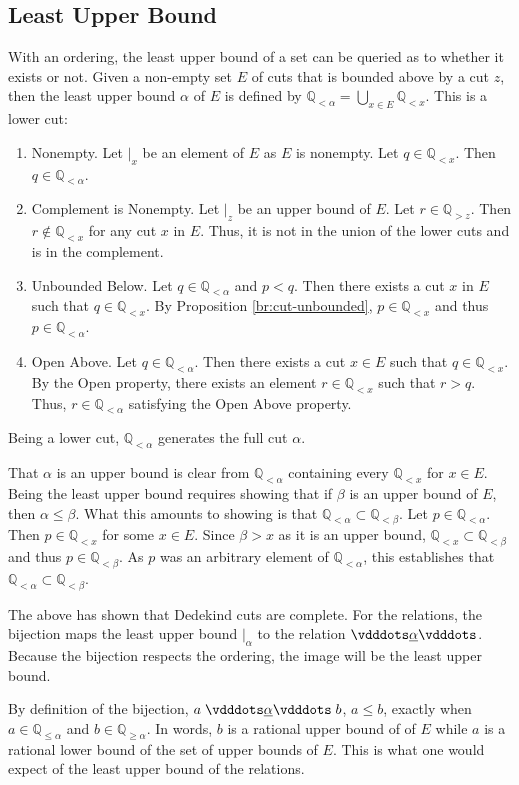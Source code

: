 \documentclass[12pt]{article}
\newcommand{\qcut}[2][x]{\ensuremath{\mathbb{Q}_{#2 #1}}}
\newcommand{\qlt}[1][x]{\qcut[#1]{<}}
\newcommand{\qgt}[1][x]{\qcut[#1]{>}}
\newcommand{\qgeq}[1][x]{\qcut[#1]{\geq}}
\newcommand{\qleq}[1][x]{\qcut[#1]{\leq}}
\newcommand{\cut}[1][x]{{\vert}_{#1} }
\begin{document}
\subsection{Least Upper Bound}

With an ordering, the least upper bound of a set can be queried as to whether it exists or not. Given a non-empty set $E$ of cuts that is bounded above by a cut $z$, then the least upper bound $\alpha$ of $E$ is defined by $\qlt[\alpha] = \bigcup_{x \in E} \qlt$. This is a lower cut: 
\begin{enumerate}
    \item Nonempty. Let $\cut$ be an element of $E$ as $E$ is nonempty. Let $q \in \qlt$. Then $q \in \qlt[\alpha]$.
    \item Complement is Nonempty. Let $\cut[z]$ be an upper bound of $E$. Let $r \in \qgt[z]$. Then $r \notin \qlt[x]$ for any cut $x$ in $E$. Thus, it is not in the union of the lower cuts and is in the complement. 
    \item Unbounded Below. Let $q \in \qlt[\alpha]$ and $p < q$. Then there exists a cut $x$ in $E$ such that $q \in \qlt$. By Proposition \ref{br:cut-unbounded}, $p \in \qlt$ and thus $p \in \qlt[\alpha]$.
    \item Open Above. Let $q \in \qlt[\alpha]$. Then there exists a cut $x \in E$ such that $q \in \qlt$. By the Open property, there exists an element $r \in \qlt$ such that $r > q$. Thus, $r \in \qlt[\alpha]$ satisfying the Open Above property. 
\end{enumerate}
Being a lower cut, $\qlt[\alpha]$ generates the full cut $\alpha$.

That $\alpha$ is an upper bound is clear from $\qlt[\alpha]$ containing every $\qlt$ for $x \in E$. Being the least upper bound requires showing that if $\beta$ is an upper bound of $E$, then $\alpha \leq \beta$. What this amounts to showing is that $\qlt[\alpha] \subset \qlt[\beta]$. Let $p \in \qlt[\alpha]$. Then $p \in \qlt$ for some $x \in E$. Since $\beta > x$ as it is an upper bound, $\qlt \subset \qlt[\beta]$ and thus $p \in \qlt[\beta]$. As $p$ was an arbitrary element of $\qlt[\alpha]$, this  establishes that $\qlt[\alpha] \subset \qlt[\beta]$.

The above has shown that Dedekind cuts are complete. For the relations, the bijection  maps the least upper bound $\cut[\alpha]$ to the relation $\xrel[\alpha]$. Because the bijection respects the ordering, the image will be the least upper bound. 

By definition of the bijection, $a \xrel[\alpha] b$, $a \leq b$, exactly when $a \in \qleq [\alpha]$ and $b \in \qgeq[\alpha]$. In words, $b$ is a rational upper bound of of $E$ while $a$ is a rational lower bound of the set of upper bounds of $E$. This is what one would expect of the least upper bound of the relations. 
\end{document}
